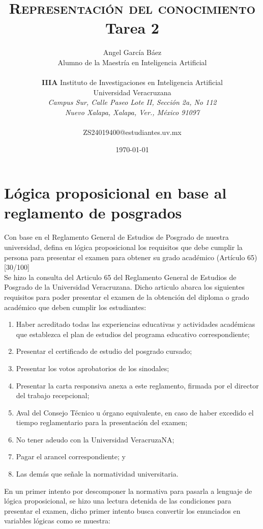 \documentclass[11pt, letterpaper]{article}
\title{\textsc{Representación del conocimiento} \\
	Tarea 2
}
\author{Angel García Báez\\
	Alumno de la Maestría en Inteligencia Artificial \\ \\ \textbf{IIIA}
	Instituto de Investigaciones en Inteligencia Artificial \\
	Universidad Veracruzana \\ \emph{Campus Sur, Calle Paseo Lote II,
		Sección 2a, No 112} \\ \emph{Nuevo Xalapa, Xalapa, Ver., México 91097}
	\\ \\ ZS24019400@estudiantes.uv.mx}
\date{\today}
\begin{document}
	
	\maketitle

	\newpage
	
	\section{Lógica proposicional en base al reglamento de posgrados}
	
	Con base en el Reglamento General de Estudios de Posgrado de nuestra
	universidad, defina en lógica proposicional los requisitos que debe cumplir la
	persona para presentar el examen para obtener su grado académico (Artículo
	65)[30/100] \\
	
	Se hizo la consulta del Articulo 65 del Reglamento General de Estudios de Posgrado de la Universidad Veracruzana. Dicho articulo abarca los siguientes requisitos para poder presentar el examen de la obtención del diploma o grado académico que deben cumplir los estudiantes:
	
	\begin{enumerate}[I]
		\item Haber acreditado todas las experiencias educativas y actividades académicas que establezca el plan de estudios del programa educativo correspondiente;		
		\item Presentar el certificado de estudio del posgrado cursado;
		\item Presentar los votos aprobatorios de los sinodales;
		\item Presentar la carta responsiva anexa a este reglamento, firmada por el director del trabajo recepcional;
		\item Aval del Consejo Técnico u órgano equivalente, en caso de haber excedido el tiempo reglamentario para la presentación del examen;
		\item No tener adeudo con la Universidad VeracruzaNA;
		\item Pagar el arancel correspondiente; y
		\item Las demás que señale la normatividad universitaria.		
	\end{enumerate}
	
	\newpage 
	
	En un primer intento por descomponer la normativa para pasarla a lenguaje de lógica proposicional, se hizo una lectura detenida de las condiciones para presentar el examen, dicho primer intento busca convertir los enunciados en variables lógicas como se muestra:
	
\end{document}

